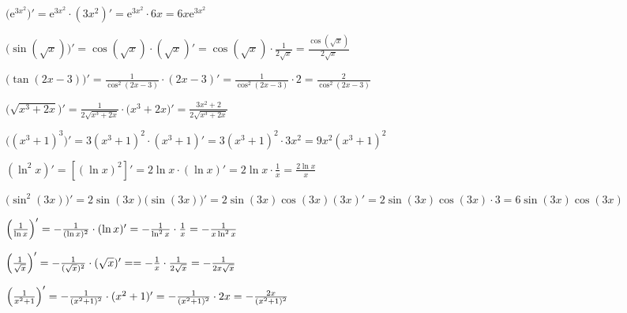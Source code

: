 \documentclass[a4paper,table]{report}
\begin{document}
  \begin{example}
    $ \bigl(\mathrm{e}^{3x^{2}}\bigr)' = \mathrm{e}^{3x^{2}} \cdot (3x^{2})' =
    \mathrm{e}^{3x^{2}} \cdot 6x = 6x \mathrm{e}^{3x^{2}} $
  \end{example}
  \begin{example}
    $ \bigl(\sin{(\sqrt{x})} \bigr)' = \cos{(\sqrt{x})} \cdot (\sqrt{x})' =
    \cos{(\sqrt{x})} \cdot \frac{1}{2 \sqrt{x}} = \frac{\cos{(\sqrt{x})}}{2 \sqrt{x}} $
  \end{example}
  \begin{example}
    $ \bigl(\tan{(2x-3)}\bigr)' = \frac{1}{\cos^{2}{(2x-3)}} \cdot (2x-3)' =
    \frac{1}{\cos^{2}{(2x-3)}} \cdot 2 = \frac{2}{\cos^{2}{(2x-3)}} $
  \end{example}
  \begin{example}
    $ \bigl(\sqrt{x^{3}+2x}\bigr)' = \frac{1}{2 \sqrt{x^{3}+2x}} 
    \cdot \bigl(x^{3}+2x\bigr)' = \frac{3x^{2}+2}{2 \sqrt{x^{3}+2x}} $
  \end{example}
  \begin{example}
    $ \bigl((x^{3}+1)^{3}\bigr)' = 3 (x^{3}+1)^{2} \cdot (x^{3}+1)' = 3 (x^{3}+1)^{2}
    \cdot 3x^{2} = 9 x^{2} (x^{3}+1)^{2} $
  \end{example}
  \begin{example}
    $ (\ln^{2}x)' = [(\ln{x} )^{2}]' = 2 \ln{x} \cdot (\ln{x} )' = 2 \ln{x} \cdot
    \frac{1}{x} = \frac{2 \ln{x}}{x} $
  \end{example}
  \begin{example}
    $ \bigl(\sin^{2}{(3x)}\bigr)' \!\! = 2 \sin{(3x)} \bigl(\sin{(3x)}\bigr)' 
    \! = 2 \sin{(3x)} \cos{(3x)} (3x)' 
    \! = 2 \sin{(3x)} \cos{(3x)} \cdot 3 
    \! = 6 \sin{(3x)} \cos{(3x)} \!\!\!\!\! $
  \end{example}
  \begin{example}
    $ \Bigl(\frac{1}{\ln{x}} \Bigr)' = - \frac{1}{(\ln{x} )^{2}} \cdot (\ln{x} )' 
    = - \frac{1}{\ln^{2}{x}} \cdot \frac{1}{x} = - \frac{1}{x \ln^{2}{x}} $ 
  \end{example}
  \begin{example}
    $ \Bigl(\frac{1}{\sqrt{x}}\Bigr)' = - \frac{1}{(\sqrt{x} )^{2}} \cdot (\sqrt{x})' = 
    = - \frac{1}{x} \cdot \frac{1}{2 \sqrt{x}} = - \frac{1}{2 x \sqrt{x}} $
  \end{example}
  \begin{example}
    $ \Bigl(\frac{1}{x^{2}+1} \Bigr)' = - \frac{1}{(x^{2}+1)^{2}} \cdot (x^{2}+1)' = 
    - \frac{1}{(x^{2}+1)^{2}} \cdot 2x = - \frac{2x}{(x^{2}+1)^{2}} $ 
  \end{example}
\end{document}
